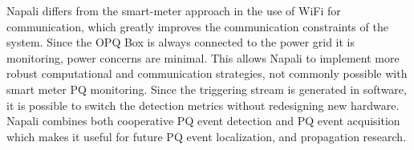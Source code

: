 Napali differs from the smart-meter approach in the use of WiFi for communication, which greatly improves the communication constraints of the system.
Since the OPQ Box is always connected to the power grid it is monitoring, power concerns are minimal.
This allows Napali to implement more robust computational and communication strategies, not commonly possible with smart meter PQ monitoring.
Since the triggering stream is generated in software, it is possible to switch the detection metrics without redesigning new hardware.
Napali combines both cooperative PQ event detection and PQ event acquisition which makes it useful for future PQ event localization, and propagation research. \cite{parsons1998direction} \cite{polajvzer2017evaluation}
